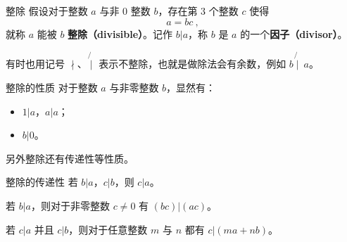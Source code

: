 
\begin{definition}{整除}
假设对于整数 $a$ 与非 $0$ 整数 $b$，存在第 $3$ 个整数 $c$ 使得
\begin{equation}
a = bc ~,
\end{equation}
就称 $a$ 能被 $b$ \textbf{整除（divisible）}。记作 $b | a$，称 $b$ 是 $a$ 的一个\textbf{因子（divisor）}。
\end{definition}

有时也用记号 $\nmid$、$\not{\mid}$ 表示不整除，也就是做除法会有余数，例如 $b \not{\mid}~ a$。

\begin{corollary}{整除的性质}
对于整数 $a$ 与非零整数 $b$，显然有：
\begin{itemize}
\item $1 | a$，$a | a$；
\item $b | 0$。
\end{itemize}
\end{corollary}

另外整除还有传递性等性质。
\begin{theorem}{整除的传递性}
若 $b|a$，$c|b$，则 $c|a$。
\end{theorem}
\begin{theorem}{}
若 $b|a$，则对于非零整数 $c \neq 0$ 有 $(bc) | (ac)$。
\end{theorem}
\begin{theorem}{}
若 $c|a$ 并且 $c|b$，则对于任意整数 $m$ 与 $n$ 都有 $c | (ma + nb)$。
\end{theorem}